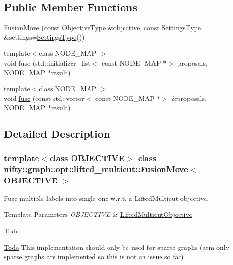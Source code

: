 \subsection*{Public Member Functions}
\begin{DoxyCompactItemize}
\item 
\hyperlink{classnifty_1_1graph_1_1opt_1_1lifted__multicut_1_1FusionMove_aad28fcbfba24bc2f0b0865d7e58e56da}{Fusion\+Move} (const \hyperlink{classnifty_1_1graph_1_1opt_1_1lifted__multicut_1_1FusionMove_a1d10c7f91df1a4ef65d94e27126342d7}{Objective\+Type} \&objective, const \hyperlink{structnifty_1_1graph_1_1opt_1_1lifted__multicut_1_1FusionMove_1_1SettingsType}{Settings\+Type} \&settings=\hyperlink{structnifty_1_1graph_1_1opt_1_1lifted__multicut_1_1FusionMove_1_1SettingsType}{Settings\+Type}())
\item 
{\footnotesize template$<$class N\+O\+D\+E\+\_\+\+M\+AP $>$ }\\void \hyperlink{classnifty_1_1graph_1_1opt_1_1lifted__multicut_1_1FusionMove_ad66c58d96b24e5aaff3e0d510fd2a550}{fuse} (std\+::initializer\+\_\+list$<$ const N\+O\+D\+E\+\_\+\+M\+AP $\ast$$>$ proposals, N\+O\+D\+E\+\_\+\+M\+AP $\ast$result)
\item 
{\footnotesize template$<$class N\+O\+D\+E\+\_\+\+M\+AP $>$ }\\void \hyperlink{classnifty_1_1graph_1_1opt_1_1lifted__multicut_1_1FusionMove_ad02136d55b94cab57454ec413b3db4cf}{fuse} (const std\+::vector$<$ const N\+O\+D\+E\+\_\+\+M\+AP $\ast$$>$ \&proposals, N\+O\+D\+E\+\_\+\+M\+AP $\ast$result)
\end{DoxyCompactItemize}


\subsection{Detailed Description}
\subsubsection*{template$<$class O\+B\+J\+E\+C\+T\+I\+VE$>$\newline
class nifty\+::graph\+::opt\+::lifted\+\_\+multicut\+::\+Fusion\+Move$<$ O\+B\+J\+E\+C\+T\+I\+V\+E $>$}

Fuse multiple labels into single one w.\+r.\+t. a Lifted\+Multicut objective. 


\begin{DoxyTemplParams}{Template Parameters}
{\em O\+B\+J\+E\+C\+T\+I\+VE} & \hyperlink{classnifty_1_1graph_1_1opt_1_1lifted__multicut_1_1LiftedMulticutObjective}{Lifted\+Multicut\+Objective}\\
\hline
\end{DoxyTemplParams}
\begin{DoxyRefDesc}{Todo}
\item[\hyperlink{todo__todo000001}{Todo}]This implementation should only be used for sparse graphs (atm only sparse graphs are implemented so this is not an issue so far) \end{DoxyRefDesc}


